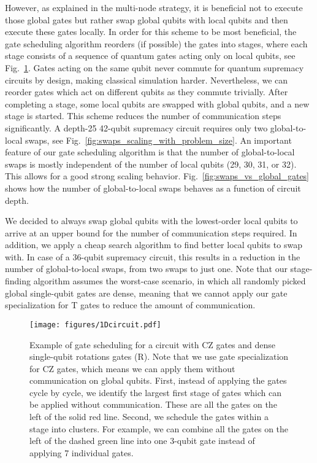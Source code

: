 \documentclass[sigconf]{acmart}
\begin{document}
However, as explained in the multi-node strategy, it is beneficial not to execute those global gates but rather swap global qubits with local qubits and then execute these gates locally. In order for this scheme to be most beneficial, the gate scheduling algorithm reorders (if possible) the gates into stages, where each stage consists of a sequence of quantum gates acting only on local qubits, see Fig.~\ref{fig:gate_scheduling}. Gates acting on the same qubit never commute for quantum supremacy circuits by design, making classical simulation harder. Nevertheless, we can reorder gates which act on different qubits as they commute trivially.
After completing a stage, some local qubits are swapped with global qubits, and a new stage is started. This scheme reduces the number of communication steps significantly. A depth-25 42-qubit supremacy circuit requires only two global-to-local swaps, see Fig.~\ref{fig:swaps_scaling_with_problem_size}. An important feature of our gate scheduling algorithm is that the number of global-to-local swaps is mostly independent of the number of local qubits (29, 30, 31, or 32). This allows for a good strong scaling behavior. Fig.~\ref{fig:swaps_vs_global_gates} shows how the number of global-to-local swaps behaves as a function of circuit depth.

We decided to always swap global qubits with the lowest-order local qubits to arrive at an upper bound for the number of communication steps required. In addition, we apply a cheap search algorithm to find better local qubits to swap with. In case of a 36-qubit supremacy circuit, this results in a  reduction in the number of global-to-local swaps, from two swaps to just one. Note that our stage-finding algorithm assumes the worst-case scenario, in which all randomly picked global single-qubit gates are dense, meaning that we cannot apply our gate specialization for T gates to reduce the amount of communication. 
 

\begin{figure}[ht]
	\texttt{[image: figures/1Dcircuit.pdf]}
	\caption{Example of gate scheduling for a circuit with CZ gates and dense single-qubit rotations gates (R). Note that we use gate specialization for CZ gates, which means we can apply them without communication on global qubits. First, instead of applying the gates cycle by cycle, we identify the largest first stage of gates which can be applied without communication. These are all the gates on the left of the solid red line. Second, we schedule the gates within a stage into clusters. For example, we can combine all the gates on the left of the dashed green line into one 3-qubit gate instead of applying 7 individual gates.}
	\label{fig:gate_scheduling}
\end{figure}
\end{document}
